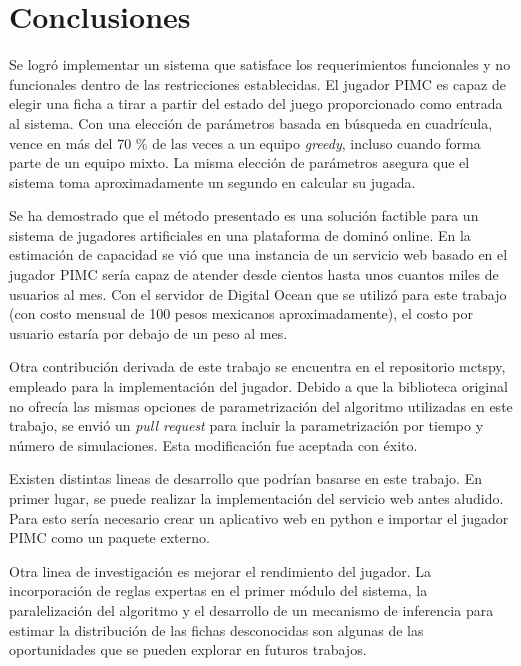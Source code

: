 \chapter*{Conclusiones}


\noindent
Se logró implementar un sistema que satisface los requerimientos funcionales y
no funcionales dentro de las restricciones establecidas. El jugador PIMC es
capaz de elegir una ficha a tirar a partir del estado del juego proporcionado
como entrada al sistema. Con una elección de parámetros basada en búsqueda en
cuadrícula, vence en más del 70 \% de las veces a un equipo \textit{greedy},
incluso cuando forma parte de un equipo mixto. La misma elección de parámetros
asegura que el sistema toma aproximadamente un segundo en calcular su jugada.

Se ha demostrado que el método presentado es una solución factible para un
sistema de jugadores artificiales en una plataforma de dominó online. En la
estimación de capacidad se vió que una instancia de un servicio web basado en el
jugador PIMC sería capaz de atender desde cientos hasta unos cuantos miles de
usuarios al mes. Con el servidor de Digital Ocean que se utilizó para este
trabajo (con costo mensual de 100 pesos mexicanos aproximadamente), el costo por
usuario estaría por debajo de un peso al mes.

Otra contribución derivada de este trabajo se encuentra en el repositorio
mctspy, empleado para la implementación del jugador. Debido a que la biblioteca
original no ofrecía las mismas opciones de parametrización del algoritmo
utilizadas en este trabajo, se envió un \textit{pull request} para incluir la
parametrización por tiempo y número de simulaciones. Esta modificación fue
aceptada con éxito.

Existen distintas lineas de desarrollo que podrían basarse en este trabajo. En
primer lugar, se puede realizar la implementación del servicio web antes
aludido. Para esto sería necesario crear un aplicativo web en python e importar
el jugador PIMC como un paquete externo.

Otra linea de investigación es mejorar el rendimiento del jugador. La
incorporación de reglas expertas en el primer módulo del sistema, la
paralelización del algoritmo y el desarrollo de un mecanismo de inferencia para
estimar la distribución de las fichas desconocidas son algunas de las
oportunidades que se pueden explorar en futuros trabajos.